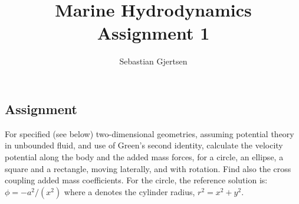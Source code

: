 \documentclass[a4paper,norsk]{article}
\begin{document}
\title{Marine Hydrodynamics \\ Assignment 1}
\author{Sebastian Gjertsen}

\maketitle
\begin{center}
\subsection*{Assignment}

For specified (see below) two-dimensional geometries, assuming potential theory in unbounded fluid, and use of Green's second identity, calculate the velocity potential along the body and the added mass forces, for a circle, an ellipse, a square and a rectangle, moving laterally, and with rotation. Find also the cross coupling added mass coefficients. For the circle, the reference solution is: $ \phi =-a^2/(x^2)$ where a denotes the cylinder radius, $r^2=x^2+y^2$.
\end{center}
\end{document}
